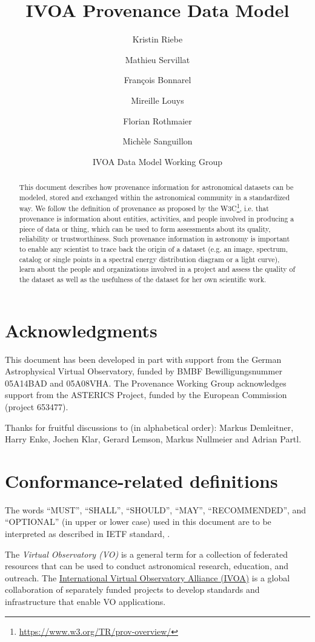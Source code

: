 \documentclass[11pt,a4paper]{ivoa}
\title{IVOA Provenance Data Model}
\author{Kristin Riebe}
\author{Mathieu Servillat}
\author{François Bonnarel}
\author{Mireille Louys}
\author{Florian Rothmaier}
\author{Michèle Sanguillon}
\author{IVOA Data Model Working Group}
\begin{document}

\begin{abstract}
This document describes how provenance information for astronomical datasets 
can be modeled, stored and exchanged within 
the astronomical community in a standardized way.
We follow the definition of provenance as proposed by the W3C\footnote{\url{https://www.w3.org/TR/prov-overview/}}, i.e. that provenance is information about entities, activities, and people involved in producing a piece of data or thing, which can be used to form assessments about its quality, reliability or trustworthiness.
Such provenance information in astronomy is important to enable any scientist to trace back
the origin of a dataset (e.g. an image, spectrum, catalog or single points in a 
spectral energy distribution diagram or a light curve), learn about the people and 
organizations involved in a project and assess the quality of the dataset as well
as the usefulness of the dataset for her own scientific work.
\end{abstract}


\section*{Acknowledgments}

This document has been developed in part with support from the German
Astrophysical Virtual Observatory, funded by BMBF Bewilligungsnummer 05A14BAD and 05A08VHA.
The Provenance Working Group acknowledges support from the ASTERICS Project, funded by the European Commission (project 653477).

Thanks for fruitful discussions to (in alphabetical order):
Markus Demleitner, Harry Enke, Jochen Klar, Gerard Lemson, Markus Nullmeier
and Adrian Partl.



\section*{Conformance-related definitions}

The words ``MUST'', ``SHALL'', ``SHOULD'', ``MAY'', ``RECOMMENDED'', and
``OPTIONAL'' (in upper or lower case) used in this document are to be
interpreted as described in IETF standard, \citet{std:RFC2119}.

The \emph{Virtual Observatory (VO)} is
a general term for a collection of federated resources that can be used
to conduct astronomical research, education, and outreach.
The \href{http://www.ivoa.net}{International
Virtual Observatory Alliance (IVOA)} is a global
collaboration of separately funded projects to develop standards and
infrastructure that enable VO applications.
\end{document}
